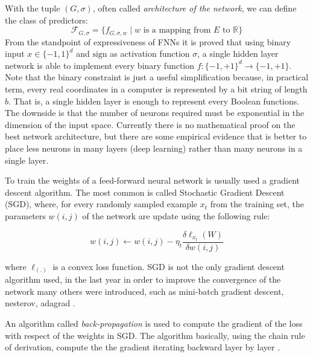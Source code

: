 With the tuple $(G, \sigma)$, often called \emph{architecture of the network}, we can define the class of predictors: 
\[ \mathcal{F}_{G, \sigma} = \{ f_{G, \sigma, w} \mid w \textrm{ is a mapping from } E \textrm{ to } \mathbb R \} \]
From the standpoint of expressiveness of FNNs it is proved that using binary input $x \in \{-1, 1\}^d$ and $\mathrm{sign}$ as activation
function $\sigma$, a single hidden layer network is able to
implement every binary function $f: \{-1, +1\}^d \to \{-1, +1\}$. Note that the
binary constraint is just a useful simplification because, in
practical term, every real coordinates in a computer is represented
by a bit string of length $b$. That is, a single hidden layer is
enough to represent every Boolean functions. The downside is that
the number of neurons required must be exponential in the dimension
of the input space. Currently there is no mathematical proof on the
best network architecture, but there are some empirical evidence
that is better to place less neurons in many layers (deep learning)
rather than many neurons in a single layer. %

To train the weights of a feed-forward neural network is usually
used a gradient descent algorithm. The most common is called
Stochastic Gradient Descent (SGD), where, for every randomly sampled
example $x_t$ from the training set, the parameters $w(i, j)$ of the
network are update using the following rule:

\begin{equation} \label{eq:sgd} 
w(i, j) \leftarrow w(i, j) -  \eta_t \frac{\delta\ell_{x_t}(W)}{\delta w(i, j )}
\end{equation}

where $\ell_(.)$ is a convex loss function. SGD is not the only
gradient descent algorithm used, in the last year in order to
improve the convergence of the network many others were introduced,
such as mini-batch gradient descent, nesterov, adagrad
\cite{RuderGDOpt}. 

An algorithm called \emph{back-propagation} is used to compute the
gradient of the loss with respect of the weights in SGD. The
algorithm basically, using the chain rule of derivation, compute the
the gradient iterating backward layer by layer
\cite{HintonBackProp}.
 

